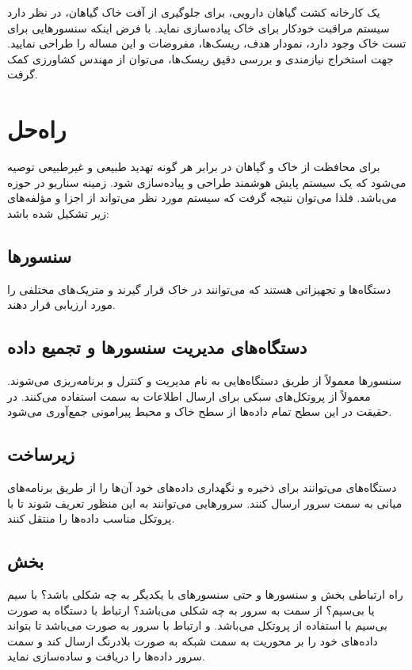 \documentclass[a4paper]{report}
\begin{document}
یک کارخانه کشت‌ گیاهان دارویی، برای جلوگیری از آفت خاک گیاهان، در نظر دارد سیستم
مراقبت خودکار برای خاک پیاده‌سازی نماید. با فرض اینکه سنسورهایی برای تست خاک
وجود دارد، نمودار هدف، ریسک‌ها، مفروضات و  این مساله را طراحی نمایید.
جهت استخراج نیازمندی و بررسی دقیق ریسک‌ها، می‌توان از مهندس کشاورزی کمک گرفت.

\section*{راه‌حل}

برای محافظت از خاک و گیاهان در برابر هر گونه تهدید طبیعی و غیرطبیعی توصیه می‌شود
که یک سیستم پایش هوشمند  طراحی و پیاده‌سازی
شود. زمینه سناریو در حوزه  می‌باشد. فلذا می‌توان نتیجه گرفت که سیستم
مورد نظر می‌تواند از اجزا و مؤلفه‌های زیر تشکیل شده باشد:

\subsection*{سنسور‌ها}

دستگاه‌ها و تجهیزاتی هستند که می‌توانند در خاک قرار گیرند و متریک‌های مختلفی را
مورد ارزیابی قرار دهند.

\subsection*{دستگاه‌های مدیریت سنسور‌ها و تجمیع داده}

سنسور‌ها معمولاً از طریق دستگاه‌هایی به نام  مدیریت و کنترل و
برنامه‌ریزی می‌شوند. معمولاً از پروتکل‌های سبکی برای ارسال اطلاعات به سمت
 استفاده می‌کنند. در حقیقت در این سطح تمام داده‌ها از سطح خاک و محیط
پیرامونی جمع‌آوری می‌شود.

\subsection*{زیرساخت}

دستگا‌ه‌های  می‌توانند برای ذخیره و نگهداری داده‌های خود آن‌ها
را از طریق برنامه‌های میانی به سمت سرور ارسال کنند. سرو‌ر‌هایی می‌توانند به این
منظور تعریف شوند تا با پروتکل مناسب داده‌ها را منتقل کنند.

\subsection*{بخش‌ }

راه ارتباطی بخش  و سنسور‌ها و حتی سنسور‌های با یکدیگر به چه شکلی
باشد؟ با سیم یا بی‌سیم؟ از سمت  به سرور به چه شکلی می‌باشد؟
ارتباط با دستگاه  به صورت بی‌سیم با استفاده از پروتکل
 می‌باشد. و ارتباط  با سرور به صورت  می‌باشد تا بتواند داده‌های خود را بر محوریت  به سمت شبکه به صورت
بلادرنگ ارسال کند و سمت سرور داده‌ها را دریافت و ساده‌سازی نماید.
\end{document}
